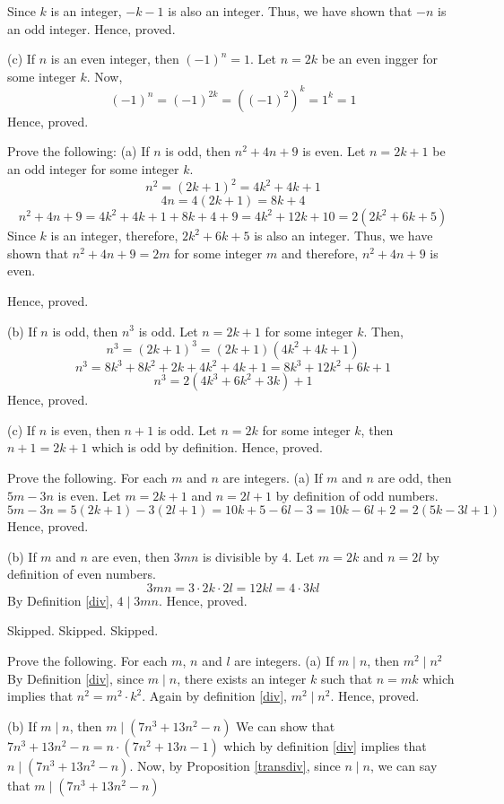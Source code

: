 		Since $k$ is an integer, $-k-1$ is also an integer. Thus, we have shown that $-n$ is an odd integer. Hence, proved.
	\es

	(c) If $n$ is an even integer, then $(-1)^n = 1$.
	\bs
		Let $n = 2k$ be an even ingger for some integer $k$. Now, 
		$$(-1)^n = (-1)^{2k} = ((-1)^2)^k = 1^k = 1$$
		Hence, proved.
	\es
\ep 

\bp 
	Prove the following:
	\bigbreak
	(a) If $n$ is odd, then $n^2 + 4n + 9$ is even.
	\bs
		Let $n = 2k+1$ be an odd integer for some integer $k$.
		$$n^2 = (2k+1)^2 = 4k^2 + 4k + 1$$
		$$4n = 4(2k+1) = 8k + 4$$
		$$n^2 + 4n + 9 = 4k^2 + 4k + 1 + 8k + 4 + 9 = 4k^2 + 12k + 10 = 2(2k^2+6k+5)$$
		Since $k$ is an integer, therefore, $2k^2+6k+5$ is also an integer. Thus, we have shown that $n^2 + 4n + 9 = 2m$ for some integer $m$ and therefore, $n^2 + 4n + 9$ is even.

		Hence, proved.
	\es
	
	(b) If $n$ is odd, then $n^3$ is odd.
	\bs
		Let $n = 2k+1$ for some integer $k$. Then,
		$$n^3 = (2k+1)^3 = (2k+1)(4k^2+4k+1)$$
		$$n^3 = 8k^3+8k^2+2k+4k^2+4k+1 = 8k^3 + 12k^2 + 6k + 1$$
		$$n^3 = 2(4k^3+6k^2+3k) + 1$$
		Hence, proved.
	\es

	(c) If $n$ is even, then $n+1$ is odd.
	\bs
		Let $n = 2k$ for some integer $k$, then $n+1 = 2k+1$ which is odd by definition. Hence, proved.
	\es
\ep 

\bp 
	Prove the following. For each $m$ and $n$ are integers.
	\bigbreak
	(a) If $m$ and $n$ are odd, then $5m-3n$ is even.
	\bs
		Let $m = 2k+1$ and $n = 2l+1$ by definition of odd numbers.
		$$5m-3n = 5(2k+1)-3(2l+1) = 10k+5-6l-3 = 10k-6l+2 = 2(5k-3l+1)$$
		Hence, proved.
	\es

	(b) If $m$ and $n$ are even, then $3mn$ is divisible by $4$.
	\bs
		Let $m = 2k$ and $n = 2l$ by definition of even numbers.
		$$3mn = 3 \cdot 2k \cdot 2l = 12kl = 4 \cdot  3kl$$
		By Definition \ref{div}, $4 \mid 3mn$. Hence, proved.
	\es
\ep 

\bp Skipped.\ep 
\bp Skipped.\ep 
\bp Skipped.\ep 

\bp 
	Prove the following. For each $m$, $n$ and $l$ are integers.
	\bigbreak
	(a) If $m \mid n$, then $m^2 \mid n^2$
	\bs
		By Definition \ref{div}, since $m \mid n$, there exists an integer $k$ such that $n = mk$ which implies that $n^2 = m^2 \cdot k^2$.
		Again by definition \ref{div}, $m^2 \mid n^2$. 
		Hence, proved.
	\es

	(b) If $m \mid n$, then $m \mid (7n^3 + 13n^2 - n)$
	\bs
		We can show that $7n^3 + 13n^2 - n = n \cdot (7n^2 + 13n - 1)$ which by definition \ref{div} implies that $n \mid (7n^3 + 13n^2 - n)$.
		Now, by Proposition \ref{transdiv}, since $n \mid n$, we can say that $m \mid (7n^3 + 13n^2 - n)$
	\es

